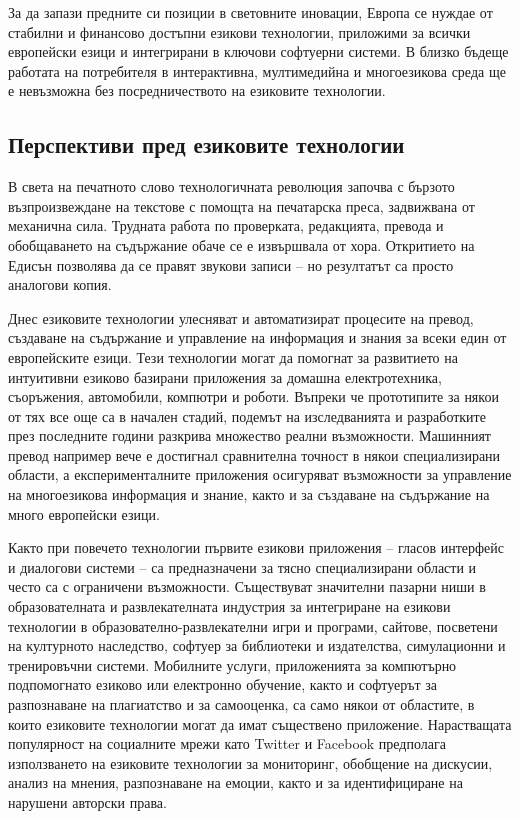 \begin{multicols}{2}
  За да запази предните си позиции в световните иновации, Европа се нуждае от стабилни и финансово достъпни езикови технологии, приложими за всички европейски езици и интегрирани в ключови софтуерни системи.
  В близко бъдеще работата на потребителя в интерактивна, мултимедийна и многоезикова  среда ще е  невъзможна
  без посредничеството на езиковите технологии.

  \subsection{Перспективи пред езиковите технологии}

  В света на печатното слово технологичната революция започва с бързото възпроизвеждане на текстове с помощта на печатарска преса, задвижвана от механична сила. Трудната работа по проверката, редакцията, превода и обобщаването на съдържание обаче се е извършвала от хора. Откритието на Едисън позволява да се правят звукови записи – но резултатът са просто аналогови копия.

  Днес езиковите технологии улесняват и автоматизират процесите на превод, създаване на съдържание и управление на информация и знания за всеки един от европейските езици. Тези технологии могат да помогнат за развитието на интуитивни
   езиково базирани приложения за домашна електротехника, съоръжения, автомобили, компютри и роботи. Въпреки че прототипите
   за някои от тях все още са в начален стадий, подемът на изследванията и разработките през последните години разкрива множество реални възможности. Машинният превод например вече е достигнал сравнителна точност в някои специализирани области, а
   експерименталните приложения осигуряват възможности за управление на
   многоезикова информация и знание, както и за
   създаване на съдържание на много европейски езици.


  Както при повечето технологии първите езикови приложения -- гласов
   интерфейс и диалогови системи -- са предназначени за тясно специализирани области и често са с ограничени възможности. 
   Съществуват значителни пазарни ниши в образователната и развлекателната индустрия за интегриране на  езикови технологии в образователно-развлекателни  игри и програми, сайтове, посветени на културното наследство, софтуер за библиотеки и издателства, симулационни и тренировъчни системи. 
  Мобилните услуги, приложенията за компютърно подпомогнато езиково или електронно обучение, както и софтуерът за разпознаване
   на плагиатство и за самооценка, са само някои от областите, в които езиковите технологии могат да имат съществено приложение. Нарастващата популярност на социалните мрежи като Twitter и Facebook предполага използването на езиковите технологии за мониторинг, обобщение на дискусии, анализ на мнения, разпознаване на емоции, както и за идентифициране на нарушени авторски права.


\end{multicols}
